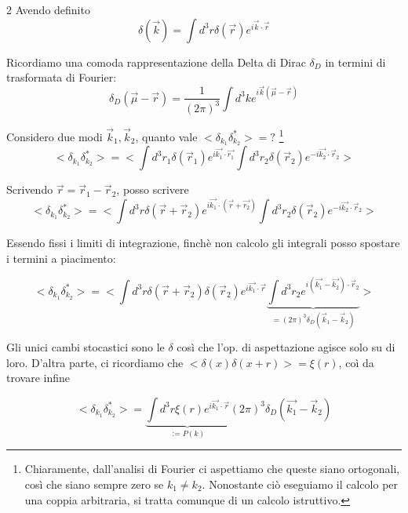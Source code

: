 \documentclass{report}
\begin{document}
\begin{multicols}{2}
    Avendo definito 
    \begin{equation}
        \delta(\vec{k}) = \int d^3r\delta(\vec{r})e^{i\vec{k}\cdot\vec{r}}
    \end{equation}

    Ricordiamo una comoda rappresentazione della Delta di Dirac $\delta_D$ in termini di trasformata di Fourier: 
    \begin{equation}
        \delta_D(\vec{\mu}- \vec{r}) = \frac{1}{(2\pi)^3}\int d^3ke^{i\vec{k}(\vec{\mu}- \vec{r})}
    \end{equation}

    Considero due modi $\vec{k}_1, \vec{k}_2$, quanto vale $<\delta_{k_1}\delta^{*}_{k_2}> = ?$ \footnote{Chiaramente, dall'analisi di Fourier ci aspettiamo che queste siano ortogonali, così che siano sempre zero se $k_1 \neq k_2$. Nonostante ciò eseguiamo il calcolo per una coppia arbitraria, si tratta comunque di un calcolo istruttivo.} 
    \begin{equation}
        <\delta_{k_1}\delta^{*}_{k_2}> = <\int d^3r_1\delta(\vec{r}_1)e^{i\vec{k_1}\cdot\vec{r_1}}\int d^3r_2\delta(\vec{r}_2)e^{-i\vec{k_2}\cdot\vec{r}_2}>
    \end{equation}
\end{multicols}

Scrivendo $\vec{r} = \vec{r}_1 - \vec{r}_2$, posso scrivere 
\begin{equation}
     <\delta_{k_1}\delta^{*}_{k_2}> = <\int d^3r\delta(\vec{r} + \vec{r}_2)e^{i\vec{k_1}\cdot(\vec{r} + \vec{r_2})}\int d^3r_2\delta(\vec{r}_2)e^{-i\vec{k_2}\cdot\vec{r}_2}>
\end{equation}

Essendo fissi i limiti di integrazione, finchè non calcolo gli integrali posso spostare i termini a piacimento: 

\begin{equation}
    <\delta_{k_1}\delta^{*}_{k_2}> = <\int d^3r\delta(\vec{r} + \vec{r}_2)\delta(\vec{r}_2)e^{i\vec{k_1}\cdot\vec{r}} \underbrace{\int d^3r_2e^{i(\vec{k_1} - \vec{k_2})\cdot\vec{r}_2}}_{= (2\pi)^3\delta_D(\vec{k}_1 - \vec{k}_2)}>
\end{equation}

Gli unici cambi stocastici sono le $\delta$ così che l'op. di aspettazione agisce solo su di loro. D'altra parte, ci ricordiamo che $<\delta(x)\delta(x+r)> = \xi(r)$, coì da trovare infine 

\begin{equation}
    <\delta_{k_1}\delta^{*}_{k_2}> = \underbrace{\int d^3r\xi(r)e^{i\vec{k_1}\cdot\vec{r}}}_{:= P(k)}(2\pi)^3\delta_D(\vec{k_1} - \vec{k}_2)
\end{equation}
\end{document}
